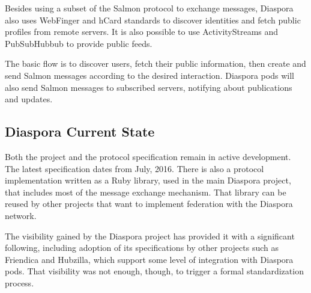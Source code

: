 Besides using a subset of the Salmon protocol to exchange messages,
Diaspora also uses WebFinger and hCard standards to discover identities
and fetch public profiles from remote servers. It is also possible to
use ActivityStreams and PubSubHubbub to provide public feeds.

The basic flow is to discover users, fetch their public information,
then create and send Salmon messages according to the desired
interaction. Diaspora pods will also send Salmon messages to subscribed
servers, notifying about publications and updates.

\subsection{Diaspora Current State}

Both the project and the protocol specification remain in active
development. The latest specification dates from July, 2016. There is
also a protocol implementation written as a Ruby library, used in the
main Diaspora project, that includes most of the message exchange
mechanism. That library can be reused by other projects that want to
implement federation with the Diaspora network.

The visibility gained by the Diaspora project has provided it with a
significant following, including adoption of its specifications by other
projects such as Friendica and Hubzilla, which support some level of
integration with Diaspora pods. That visibility was not enough, though,
to trigger a formal standardization process.
